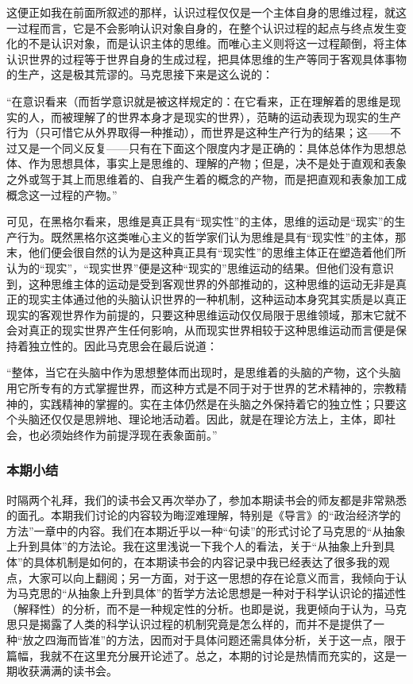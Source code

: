 \documentclass[a4paper,twoside,12pt,AutoFakeBold]{ctexart}
\begin{document}
这便正如我在前面所叙述的那样，认识过程仅仅是一个主体自身的思维过程，就这一过程而言，它是不会影响认识对象自身的，在整个认识过程的起点与终点发生变化的不是认识对象，而是认识主体的思维。而唯心主义则将这一过程颠倒，将主体认识世界的过程等于世界自身的生成过程，把具体思维的生产等同于客观具体事物的生产，这是极其荒谬的。马克思接下来是这么说的：
\begin{adjustwidth}{2em}{2em}
    \qquad\fangsong
“在意识看来（而哲学意识就是被这样规定的：在它看来，正在理解着的思维是现实的人，而被理解了的世界本身才是现实的世界），范畴的运动表现为现实的生产行为（只可惜它从外界取得一种推动），而世界是这种生产行为的结果；这——不过又是一个同义反复——只有在下面这个限度内才是正确的：具体总体作为思想总体、作为思想具体，事实上是思维的、理解的产物；但是，决不是处于直观和表象之外或驾于其上而思维着的、自我产生着的概念的产物，而是把直观和表象加工成概念这一过程的产物。”
\end{adjustwidth}

可见，在黑格尔看来，思维是真正具有“现实性”的主体，思维的运动是“现实”的生产行为。既然黑格尔这类唯心主义的哲学家们认为思维是具有“现实性”的主体，那末，他们便会很自然的认为是这种真正具有“现实性”的思维主体正在塑造着他们所认为的“现实”，“现实世界”便是这种“现实的”思维运动的结果。但他们没有意识到，这种思维主体的运动是受到客观世界的外部推动的，这种思维的运动无非是真正的现实主体通过他的头脑认识世界的一种机制，这种运动本身究其实质是以真正现实的客观世界作为前提的，只要这种思维运动仅仅局限于思维领域，那末它就不会对真正的现实世界产生任何影响，从而现实世界相较于这种思维运动而言便是保持着独立性的。因此马克思会在最后说道：
\begin{adjustwidth}{2em}{2em}
    \qquad\fangsong
“整体，当它在头脑中作为思想整体而出现时，是思维着的头脑的产物，这个头脑用它所专有的方式掌握世界，而这种方式是不同于对于世界的艺术精神的，宗教精神的，实践精神的掌握的。实在主体仍然是在头脑之外保持着它的独立性；只要这个头脑还仅仅是思辨地、理论地活动着。因此，就是在理论方法上，主体，即社会，也必须始终作为前提浮现在表象面前。”
\end{adjustwidth}


\subsubsection{本期小结}
时隔两个礼拜，我们的读书会又再次举办了，参加本期读书会的师友都是非常熟悉的面孔。本期我们讨论的内容较为晦涩难理解，特别是《导言》的“政治经济学的方法”一章中的内容。我们在本期近乎以一种“句读”的形式讨论了马克思的“从抽象上升到具体”的方法论。我在这里浅说一下我个人的看法，关于“从抽象上升到具体”的具体机制是如何的，在本期读书会的内容记录中我已经表达了很多我的观点，大家可以向上翻阅；另一方面，对于这一思想的存在论意义而言，我倾向于认为马克思的“从抽象上升到具体”的哲学方法论思想是一种对于科学认识论的描述性（解释性）的分析，而不是一种规定性的分析。也即是说，我更倾向于认为，马克思只是揭露了人类的科学认识过程的机制究竟是怎么样的，而并不是提供了一种“放之四海而皆准”的方法，因而对于具体问题还需具体分析，关于这一点，限于篇幅，我就不在这里充分展开论述了。总之，本期的讨论是热情而充实的，这是一期收获满满的读书会。
\newpage
\end{document}
